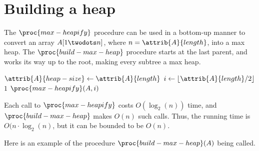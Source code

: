 \documentclass{article}
\begin{document}
\newpage

\section*{Building a heap}
The $\proc{max-heapify}$ procedure can be used in a bottom-up manner to convert an array $A[1 \twodots n]$, where $n = \attrib{A}{length}$, into a max heap. The $\proc{build-max-heap}$ procedure starts at the last parent, and works its way up to the root, making every subtree a max heap.

\begin{codebox}
\li $\attrib{A}{heap-size} \gets \attrib{A}{length}$ 
\li \For $i \gets \lfloor \attrib{A}{length}/2 \rfloor$ \Downto $1$
\li \Do
        $\proc{max-heapify}(A, i)$
    \End
\end{codebox}

Each call to $\proc{max-heapify}$ costs $O(\log_2(n))$ time, and $\proc{build-max-heap}$ makes $O(n)$ such calls. Thus, the running time is $O(n \cdot \log_2{(n)}$, but it can be bounded to be $O(n)$.

\newpage

Here is an example of the procedure $\proc{build-max-heap}(A)$ being called.
\end{document}
